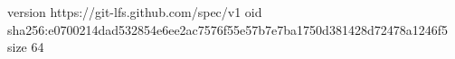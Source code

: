 version https://git-lfs.github.com/spec/v1
oid sha256:e0700214dad532854e6ee2ac7576f55e57b7e7ba1750d381428d72478a1246f5
size 64
